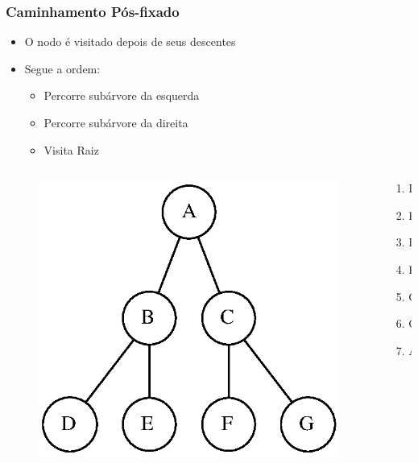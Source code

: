 \documentclass[aspectratio=169]{beamer}
\begin{document}
\begin{frame}\frametitle{Caminhamento Pós-fixado}
\begin{itemize}
	\item O nodo é visitado depois de seus descentes
	\item Segue a ordem:
	\begin{itemize}
		\item Percorre subárvore da esquerda
		\item Percorre subárvore da direita
		\item Visita Raiz
	\end{itemize}
\end{itemize}
\begin{columns}[T]
\begin{column}{0.7\linewidth}
\begin{figure}[h]
	\centering
	\includegraphics[height=0.4\paperheight]{imagens/arvore_binaria08.eps}
\end{figure}
\end{column}
\begin{column}{0.3\linewidth}
\pause
\begin{enumerate}
	\item D
	\item E
	\item B
	\item F
	\item G
	\item C
	\item A
\end{enumerate}
\end{column}
\end{columns}
\end{frame}
\end{document}
